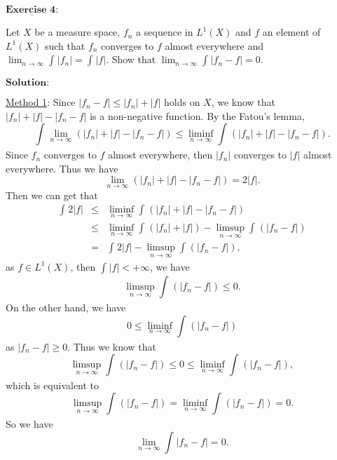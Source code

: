 \documentclass[12pt,a4paper]{ctexart}
\begin{document}
\newpage

$\underline{\textbf{Exercise 4:}}$

Let $X$ be a measure space, $f_{n}$ a sequence in $L^{1} (X)$ and $f$ an element of $L^{1}(X)$ such that $f_{n}$ converges to $f$ almost everywhere and $\lim_{n \to \infty} \int_{}^{} |f_{n}| = \int_{}^{} |f|$. Show that $\lim_{n \to \infty} \int_{}^{} |f_{n} - f| = 0$.

\vspace{8pt}
$\textbf{Solution:}$

\underline{Method 1}: Since $|f_{n} - f| \leq |f_{n}| + |f|$ holds on $X$, we know that $|f_{n}| + |f| - |f_{n} - f|$ is a non-negative function. By the Fatou's lemma,
\begin{equation*}
    \int_{}^{} \lim_{n \to \infty} (|f_{n}| + |f| - |f_{n} - f|)  \leq \liminf_{n \to \infty} \int_{}^{} (|f_{n}| + |f| - |f_{n} - f|).
\end{equation*}
Since $f_{n}$ converges to $f$ almost everywhere, then $|f_{n}|$ converges to $|f|$ almost everywhere. Thus we have
\begin{equation*}
    \lim_{n \to \infty} (|f_{n}| + |f| - |f_{n} - f|) = 2 |f|.
\end{equation*}
Then we can get that
\begin{eqnarray*}
\int_{}^{} 2 |f| & \leq & \liminf_{n \to \infty} \int_{}^{} (|f_{n}| + |f| - |f_{n} - f|) \\
& \leq & \liminf_{n \to \infty} \int_{}^{} (|f_{n}| + |f|) - \limsup_{n \to \infty}  \int_{}^{} (|f_{n} - f|) \\
& = & \int_{}^{} 2 |f| - \limsup_{n \to \infty}  \int_{}^{} (|f_{n} - f|),
\end{eqnarray*}
as $f \in L^{1}(X)$, then $\int_{}^{} |f| < + \infty$, we have
\begin{equation*}
    \limsup_{n \to \infty}  \int_{}^{} (|f_{n} - f|) \leq 0.
\end{equation*}
On the other hand, we have
\begin{equation*}
    0 \leq \liminf_{n \to \infty}  \int_{}^{} (|f_{n} - f|)
\end{equation*}
as $|f_{n} - f| \geq 0$. Thus we know that
\begin{equation*}
    \limsup_{n \to \infty}  \int_{}^{} (|f_{n} - f|) \leq 0 \leq \liminf_{n \to \infty}  \int_{}^{} (|f_{n} - f|),
\end{equation*}
which is equivalent to
\begin{equation*}
    \limsup_{n \to \infty}  \int_{}^{} (|f_{n} - f|) = \liminf_{n \to \infty}  \int_{}^{} (|f_{n} - f|) = 0.
\end{equation*}
So we have
\begin{equation*}
    \lim_{n \to \infty} \int_{}^{} |f_{n} - f| = 0.
\end{equation*}
\end{document}
